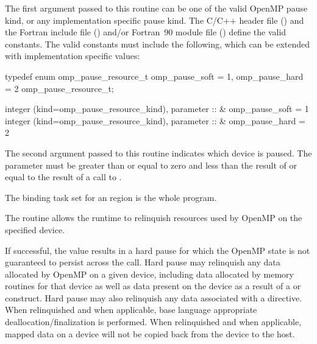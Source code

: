 \constraints

The first argument passed to this routine can be one of the valid OpenMP pause kind, 
or any implementation specific pause kind. The C/C++ header file
() and the Fortran include file () and/or Fortran~90 module file
() define the valid constants. 
The valid constants must include the following, which can be extended with implementation 
specific values:

\begin{samepage}
\format
\begin{ccppspecific}
\begin{ompcFunction}
typedef enum omp_pause_resource_t {
  omp_pause_soft = 1,
  omp_pause_hard = 2
} omp_pause_resource_t;
\end{ompcFunction}
\end{ccppspecific}
\end{samepage}

\begin{fortranspecific}
\begin{ompfFunction}
integer (kind=omp_pause_resource_kind), parameter :: &
  omp_pause_soft = 1
integer (kind=omp_pause_resource_kind), parameter :: &
  omp_pause_hard = 2
\end{ompfFunction}
\end{fortranspecific}

The second argument passed to this routine indicates which device is paused. The  parameter
must be greater than or equal to zero and less than the result of 
or equal to the result of a call to .

\binding

The binding task set for an  region is the whole program.

\effect

The  routine allows the runtime to relinquish resources 
used by OpenMP on the specified device.

If successful, the  value results in a hard pause for which the OpenMP state is not guaranteed to 
persist across the  call. Hard pause may relinquish any 
data allocated by OpenMP on a given device, including data allocated by memory routines 
for that device as well as data present on the device as a result of a  or  construct.
Hard pause may also relinquish any data associated with a  directive.
When relinquished and when applicable, base language appropriate deallocation/finalization is performed. 
When relinquished and when applicable, mapped data on a device will not be copied back from the device to the host.

